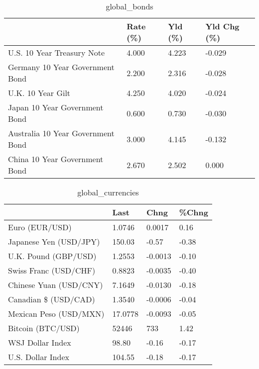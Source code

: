 \documentclass{article}%
\begin{document}
%


\begin{table}[htbp]%
\caption{global\_bonds}%
\centering%
\begin{adjustbox}{width=1\textwidth}%
\begin{tabular}{llll}
\toprule
                                  & Rate (\%) & Yld (\%) & Yld Chg (\%) \\
\midrule
       U.S. 10 Year Treasury Note &    4.000 &   4.223 &      -0.029 \\
  Germany 10 Year Government Bond &    2.200 &   2.316 &      -0.028 \\
                U.K. 10 Year Gilt &    4.250 &   4.020 &      -0.024 \\
    Japan 10 Year Government Bond &    0.600 &   0.730 &      -0.030 \\
Australia 10 Year Government Bond &    3.000 &   4.145 &      -0.132 \\
    China 10 Year Government Bond &    2.670 &   2.502 &       0.000 \\
\bottomrule
\end{tabular}
%
\end{adjustbox}%
\end{table}

%


\begin{table}[htbp]%
\caption{global\_currencies}%
\centering%
\begin{adjustbox}{width=1\textwidth}%
\begin{tabular}{llll}
\toprule
                       &    Last &    Chng & \%Chng \\
\midrule
        Euro (EUR/USD) &  1.0746 &  0.0017 &  0.16 \\
Japanese Yen (USD/JPY) &  150.03 &   -0.57 & -0.38 \\
  U.K. Pound (GBP/USD) &  1.2553 & -0.0013 & -0.10 \\
 Swiss Franc (USD/CHF) &  0.8823 & -0.0035 & -0.40 \\
Chinese Yuan (USD/CNY) &  7.1649 & -0.0130 & -0.18 \\
  Canadian \$ (USD/CAD) &  1.3540 & -0.0006 & -0.04 \\
Mexican Peso (USD/MXN) & 17.0778 & -0.0093 & -0.05 \\
     Bitcoin (BTC/USD) &   52446 &     733 &  1.42 \\
      WSJ Dollar Index &   98.80 &   -0.16 & -0.17 \\
     U.S. Dollar Index &  104.55 &   -0.18 & -0.17 \\
\bottomrule
\end{tabular}
%
\end{adjustbox}%
\end{table}
\end{document}
